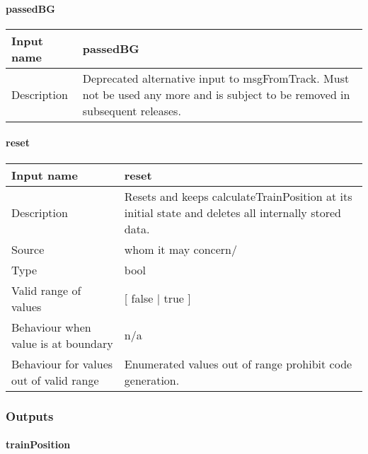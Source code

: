 \paragraph{passedBG}

\begin{longtable}{p{}p{}}
\toprule
Input name				& passedBG \\

\midrule
Description				& Deprecated alternative input to msgFromTrack. Must not be used any more and is subject to be removed in subsequent releases. 
  \\

\bottomrule
\end{longtable}


\paragraph{reset}

\begin{longtable}{p{}p{}}
\toprule
Input name				& reset \\

\midrule
Description				& Resets and keeps calculateTrainPosition at its initial state and deletes all internally stored data.  \\
\midrule
Source					& \todoTo whom it may concern/ \\ 
\midrule
Type					& bool \\  
\midrule
Valid range of values	& [ false | true ] \\

\midrule
Behaviour when value is at boundary	& n/a \\
\midrule
Behaviour for values out of valid range	& Enumerated values out of range prohibit code generation. \\

\bottomrule
\end{longtable}


\subsubsection{Outputs}\label{s:calculateTrainPosition_outputs}

\paragraph{trainPosition}

